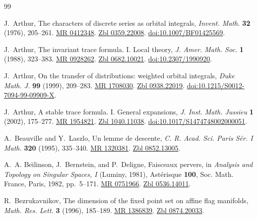 \documentclass[12pt,a4paper,oneside,english,leqno]{smfart}
\numberwithin{equation}{subsection}
\newcounter{theo}
\numberwithin{theo}{subsection}
\theoremstyle{plain}
\theoremstyle{definition}
\theoremstyle{remark}
\begin{document}
\begin{thebibliography}{99}

 J.~Arthur, The characters of discrete series as orbital integrals, \emph{Invent. Math.} \textbf{32} (1976), 205--261. \href{https://mathscinet.ams.org/mathscinet-getitem?mr=0412348}{MR 0412348}. \href{https://zbmath.org/?q=an:0359.22008}{Zbl 0359.22008}. \href{https://doi.org/10.1007/BF01425569}{doi:10.1007/BF01425569}.

 J.~Arthur, The invariant trace formula. I. Local theory, \emph{J. Amer. Math. Soc.} \textbf{1} (1988), 323--383. \href{https://mathscinet.ams.org/mathscinet-getitem?mr=0928262}{MR 0928262}. \href{https://zbmath.org/?q=an:0682.10021}{Zbl 0682.10021}. \href{https://doi.org/10.2307/1990920}{doi:10.2307/1990920}.

 J.~Arthur, On the transfer of distributions: weighted orbital integrals, \emph{Duke Math. J.} \textbf{99} (1999), 209--283. \href{https://mathscinet.ams.org/mathscinet-getitem?mr=1708030}{MR 1708030}. \href{https://zbmath.org/?q=an:0938.22019}{Zbl 0938.22019}. \href{https://doi.org/10.1215/S0012-7094-99-09909-X}{doi:10.1215/S0012-7094-99-09909-X}.

 J.~Arthur, A stable trace formula. I. General expansions, \emph{J. Inst. Math. Jussieu} \textbf{1} (2002), 175--277. \href{https://mathscinet.ams.org/mathscinet-getitem?mr=1954821}{MR 1954821}. \href{https://zbmath.org/?q=an:1040.11038}{Zbl 1040.11038}. \href{https://doi.org/10.1017/S1474748002000051}{doi:10.1017/S1474748002000051}.

 A.~Beauville and Y.~Laszlo, Un lemme de descente, \emph{C. R. Acad. Sci. Paris S\'er. I Math.} \textbf{320} (1995), 335--340. \href{https://mathscinet.ams.org/mathscinet-getitem?mr=1320381}{MR 1320381}. \href{https://zbmath.org/?q=an:0852.13005}{Zbl 0852.13005}.

 A.~A. Be\u{\i}linson, J.~Bernstein, and P.~Deligne, Faisceaux pervers, in \emph{Analysis and Topology on Singular Spaces, I} (Luminy, 1981), Ast\'erisque \textbf{100}, Soc. Math. France, Paris, 1982, pp.~5--171. \href{https://mathscinet.ams.org/mathscinet-getitem?mr=0751966}{MR 0751966}. \href{https://zbmath.org/?q=an:0536.14011}{Zbl 0536.14011}.

 R.~Bezrukavnikov, The dimension of the fixed point set on affine flag manifolds, \emph{Math. Res. Lett.} \textbf{3} (1996), 185--189. \href{https://mathscinet.ams.org/mathscinet-getitem?mr=1386839}{MR 1386839}. \href{https://zbmath.org/?q=an:0874.20033}{Zbl 0874.20033}.


\end{thebibliography}
\end{document}
